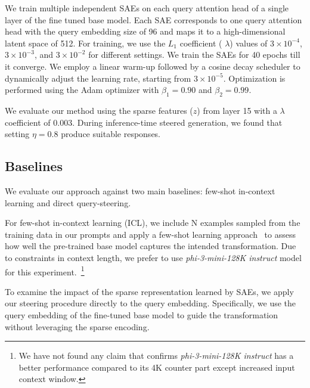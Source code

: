 We train multiple independent SAEs on each query attention head of a single layer of the fine tuned base model. Each SAE corresponds to one query attention head with the query embedding size of 96 and maps it to a high-dimensional latent space of 512. For training, we use the $L_{1}$ coefficient ( \(\lambda\)) values of $3\times10^{-4}$, $3\times10^{-3}$, and $3\times10^{-2}$ for different settings.
We train the SAEs for 40 epochs till it converge. We employ a linear warm-up followed by a cosine decay scheduler to dynamically adjust the learning rate, starting from \(3 \times 10^{-5}\). Optimization is performed using the Adam optimizer with \(\beta_{1} = 0.90\) and \(\beta_{2} = 0.99\).

We evaluate our method using the sparse features ($z$) from layer 15 with a \(\lambda\) coefficient of 0.003. During inference-time steered generation, we found that setting \(\eta = 0.8\) produce suitable responses. 


\subsection{Baselines}
We evaluate our approach against two main baselines: few-shot in-context learning and direct query-steering.

For few-shot in-context learning (ICL), we include N examples sampled from the training data in our prompts and apply a few-shot learning approach~\cite{brown2020language} to assess how well the pre-trained base model captures the intended transformation. Due to constraints in context length, we prefer to use \emph{phi-3-mini-128K instruct} model for this experiment.~\footnote{We have not found any claim that confirms \emph{phi-3-mini-128K instruct} has a better performance compared to its 4K counter part except increased input context window.}

To examine the impact of the sparse representation learned by SAEs, we apply our steering procedure directly to the query embedding. Specifically, we use the query embedding of the fine-tuned base model to guide the transformation without leveraging the sparse encoding.








